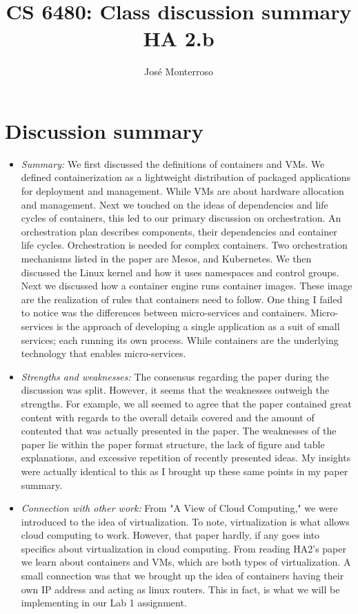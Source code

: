 \documentclass[letterpaper,twocolumn,10pt]{article}
\title{CS 6480: Class discussion summary\\
HA 2.b\\}
\author{José Monterroso}
\affil{School of Computing, University of Utah}
\begin{document}
\maketitle
\section*{Discussion summary}

\begin{itemize}

\item {\it Summary:}
We first discussed the definitions of containers and VMs. We defined containerization as a lightweight distribution
of packaged applications for deployment and management. While VMs are about hardware allocation and
management. Next we touched on the ideas of dependencies and life cycles of containers, this led to our 
primary discussion on orchestration. An orchestration plan describes components, their dependencies and container life 
cycles. Orchestration is needed for complex containers. Two orchestration 
mechanisms listed in the paper are Mesos, and Kubernetes. We then discussed the Linux kernel and how it uses
namespaces and control groups. Next we discussed how a container engine runs container
images. These image are the realization of rules that containers need to follow. 
One thing I failed to notice was the differences between micro-services and containers. Micro-services is the
approach of developing a single application as a suit of small services; each running its own process. While 
containers are the underlying technology that enables micro-services. 

\item {\it Strengths and weaknesses:} 
The consensus regarding the paper during the discussion was split. However, it seems that the weaknesses
outweigh the strengths. For example, we all seemed to agree that the paper contained great content with 
regards to the overall details covered and the amount of contented that was actually presented in the paper.
The weaknesses of the paper lie within the paper format structure, the lack of figure and table explanations,
and excessive repetition of recently presented ideas. My insights were actually identical to this as I brought 
up these same points in my paper summary.

\item {\it Connection with other work:} 
From "A View of Cloud Computing," we were introduced to the idea of virtualization. To note, 
virtualization is what allows cloud computing to work. However, that paper hardly, if any goes into specifics
about virtualization in cloud computing. From reading HA2's paper we learn about containers and VMs, which
are both types of virtualization. A small connection was that we brought up the idea of containers having
their own IP address and acting as linux routers. This in fact, is what we will be implementing in our Lab 1
assignment.  


\end{itemize}
\end{document}
